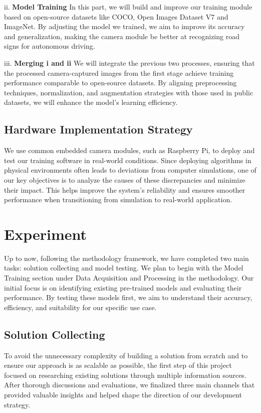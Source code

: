 \documentclass[journal,transmag]{IEEEtran}
\begin{document}
ii. \textbf{Model Training} In this part, we will build and improve our training module based on open-source datasets like COCO, Open Images Dataset V7 and ImageNet. By adjusting the model we trained, we aim to improve its accuracy and generalization, making the camera module be better at recognizing road signs for autonomous driving. 

iii. \textbf{Merging i and ii} We will integrate the previous two processes, ensuring that the processed camera-captured images from the first stage achieve training performance comparable to open-source datasets. By aligning preprocessing techniques, normalization, and augmentation strategies with those used in public datasets, we will enhance the model’s learning efficiency. 

\subsection{Hardware Implementation Strategy}

We use common embedded camera modules, such as Raspberry Pi, to deploy and test our training software in real-world conditions. Since deploying algorithms in physical environments often leads to deviations from computer simulations, one of our key objectives is to analyze the causes of these discrepancies and minimize their impact. This helps improve the system’s reliability and ensures smoother performance when transitioning from simulation to real-world application.


\section{Experiment}

Up to now, following the methodology framework, we have completed two main tasks: solution collecting and model testing. We plan to begin with the Model Training section under Data Acquisition and Processing in the methodology. Our initial focus is on identifying existing pre-trained models and evaluating their performance. By testing these models first, we aim to understand their accuracy, efficiency, and suitability for our specific use case.


\subsection{Solution Collecting}

To avoid the unnecessary complexity of building a solution from scratch and to ensure our approach is as scalable as possible, the first step of this project focused on researching existing solutions through multiple information sources. After thorough discussions and evaluations, we finalized three main channels that provided valuable insights and helped shape the direction of our development strategy.
\end{document}

